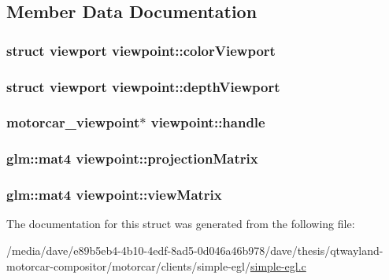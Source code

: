 \subsection{Member Data Documentation}
\hypertarget{structviewpoint_a1643bba61a70d3ea15c2d59b6ec5302d}{
\subsubsection[{color\-Viewport}]{\setlength{\rightskip}{0pt plus 5cm}struct {\bf viewport} viewpoint\-::color\-Viewport}}\label{structviewpoint_a1643bba61a70d3ea15c2d59b6ec5302d}
\hypertarget{structviewpoint_a9122e1e61615264021eac6c311956458}{
\subsubsection[{depth\-Viewport}]{\setlength{\rightskip}{0pt plus 5cm}struct {\bf viewport} viewpoint\-::depth\-Viewport}}\label{structviewpoint_a9122e1e61615264021eac6c311956458}
\hypertarget{structviewpoint_a8c1c1c5aa4dd94d65b501f05c792022c}{
\subsubsection[{handle}]{\setlength{\rightskip}{0pt plus 5cm}motorcar\-\_\-viewpoint$\ast$ viewpoint\-::handle}}\label{structviewpoint_a8c1c1c5aa4dd94d65b501f05c792022c}
\hypertarget{structviewpoint_a76ebff5efee2b82d9fac36aae8f5a055}{
\subsubsection[{projection\-Matrix}]{\setlength{\rightskip}{0pt plus 5cm}glm\-::mat4 viewpoint\-::projection\-Matrix}}\label{structviewpoint_a76ebff5efee2b82d9fac36aae8f5a055}
\hypertarget{structviewpoint_a5cbad4a6aeb2c00e2c6df0091660568f}{
\subsubsection[{view\-Matrix}]{\setlength{\rightskip}{0pt plus 5cm}glm\-::mat4 viewpoint\-::view\-Matrix}}\label{structviewpoint_a5cbad4a6aeb2c00e2c6df0091660568f}


The documentation for this struct was generated from the following file\-:\begin{DoxyCompactItemize}
\item 
/media/dave/e89b5eb4-\/4b10-\/4edf-\/8ad5-\/0d046a46b978/dave/thesis/qtwayland-\/motorcar-\/compositor/motorcar/clients/simple-\/egl/\hyperlink{simple-egl_8c}{simple-\/egl.\-c}\end{DoxyCompactItemize}
